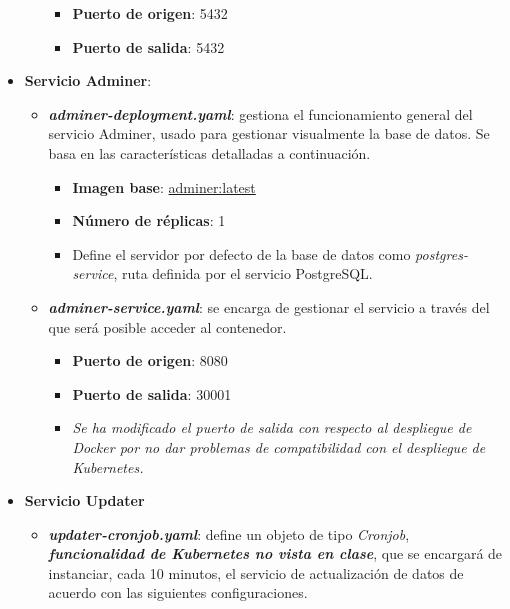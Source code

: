 \documentclass{report}
\begin{document}
\begin{itemize}
\begin{itemize}
                    \begin{itemize}
                        \item \textbf{Puerto de origen}: 5432
                        \item \textbf{Puerto de salida}: 5432
                    \end{itemize}
                \end{itemize}
                \item \textbf{Servicio Adminer}:
                \begin{itemize}
                    \item \textit{\textbf{adminer-deployment.yaml}}: gestiona el funcionamiento general del servicio Adminer, usado para gestionar visualmente la base de datos. Se basa en las características detalladas a continuación.
                    \begin{itemize}
                        \item \textbf{Imagen base}: \href{https://hub.docker.com/_/adminer/}{adminer:latest}
                        \item \textbf{Número de réplicas}: 1
                        \item Define el servidor por defecto de la base de datos como \textit{postgres-service}, ruta definida por el servicio PostgreSQL.
                    \end{itemize}
                    \item \textit{\textbf{adminer-service.yaml}}: se encarga de gestionar el servicio a través del que será posible acceder al contenedor.
                    \begin{itemize}
                        \item \textbf{Puerto de origen}: 8080
                        \item \textbf{Puerto de salida}: 30001
                        \item \textit{Se ha modificado el puerto de salida con respecto al despliegue de Docker por no dar problemas de compatibilidad con el despliegue de Kubernetes.}
                    \end{itemize}
                \end{itemize}
                \item \textbf{Servicio Updater}
                \begin{itemize}
                    \item \textit{\textbf{updater-cronjob.yaml}}: define un objeto de tipo \textit{Cronjob}, \textit{\textbf{funcionalidad de Kubernetes no vista en clase}}, que se encargará de instanciar, cada 10 minutos, el servicio de actualización de datos de acuerdo con las siguientes configuraciones.

\end{itemize}
\end{itemize}
\end{document}
